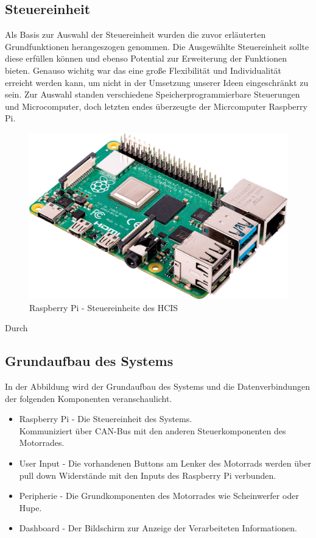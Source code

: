\subsection{Steuereinheit}
Als Basis zur Auswahl der Steuereinheit wurden die zuvor erläuterten Grundfunktionen herangeszogen genommen. Die Ausgewählte Steuereinheit sollte diese erfüllen können und ebenso Potential zur Erweiterung der Funktionen bieten. Genauso wichitg war das eine große Flexibilität und Individualität erreicht werden kann, um nicht in der Umsetzung unserer Ideen eingeschränkt zu sein. Zur Auswahl standen verschiedene Speicherprogrammierbare Steuerungen und Microcomputer, doch letzten endes überzeugte der Micrcomputer Raspberry Pi.

\begin{figure}[H]
	\begin{center}
		\includegraphics[scale=0.1]{figures/hcis/raspberryPi.png}
		\caption{Raspberry Pi - Steuereinheite des HCIS}
	\end{center}
\end{figure}

Durch 

\newpage

\subsection{Grundaufbau des Systems}
In der Abbildung wird der Grundaufbau des Systems und die Datenverbindungen der folgenden  Komponenten veranschaulicht.

\begin{itemize}
	\item Raspberry Pi - Die Steuereinheit des Systems.
	\\ Kommuniziert über CAN-Bus mit den anderen Steuerkomponenten des Motorrades.
	\item User Input - Die vorhandenen Buttons am Lenker des Motorrads werden über pull down Widerstände mit den Inputs des Raspberry Pi verbunden. 
	\item Peripherie - Die Grundkomponenten des Motorrades wie Scheinwerfer oder Hupe.
	\item Dashboard - Der Bildschirm zur Anzeige der Verarbeiteten Informationen.
\end{itemize}

